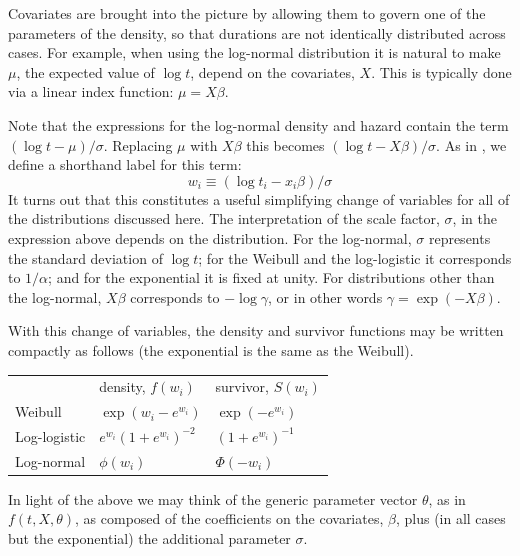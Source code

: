 Covariates are brought into the picture by allowing them to govern one
of the parameters of the density, so that durations are not
identically distributed across cases.  For example, when using the
log-normal distribution it is natural to make $\mu$, the expected
value of $\log t$, depend on the covariates, $X$.  This is typically
done via a linear index function: $\mu = X\beta$.

Note that the expressions for the log-normal density and hazard
contain the term $(\log t - \mu)/\sigma$.  Replacing $\mu$ with
$X\beta$ this becomes $(\log t - X\beta)/\sigma$.  As in
\cite{kalbfleisch02}, we define a shorthand label for this
term:
\begin{equation}
\label{eq:duration-w}
w_i \equiv (\log t_i - x_i\beta)/\sigma
\end{equation}
It turns out that this constitutes a useful simplifying change of
variables for all of the distributions discussed here.  The
interpretation of the scale factor, $\sigma$, in the expression above
depends on the distribution. For the log-normal, $\sigma$ represents
the standard deviation of $\log t$; for the Weibull and the
log-logistic it corresponds to $1/\alpha$; and for the exponential it
is fixed at unity. For distributions other than the log-normal,
$X\beta$ corresponds to $-\log \gamma$, or in other words
$\gamma = \exp(-X\beta)$.

With this change of variables, the density and survivor functions may
be written compactly as follows (the exponential is the same as the
Weibull).

\begin{center}
\setlength\tabcolsep{1.5em}
\begin{tabular}{lll}
 & density, $f(w_i)$ & survivor, $S(w_i)$ \\ [4pt]
Weibull & 
$\exp\left(w_i - e^{w_i}\right)$ & $\exp(-e^{w_i})$
\\ [4pt]
Log-logistic & 
$e^{w_i} \left(1 + e^{w_i}\right)^{-2}$ 
& $\left(1 + e^{w_i}\right)^{-1}$ \\ [1ex]
Log-normal & $\phi(w_i)$ & $\Phi(-w_i)$
\end{tabular}
\end{center}

In light of the above we may think of the generic parameter vector
$\theta$, as in $f(t, X, \theta)$, as composed of the coefficients on
the covariates, $\beta$, plus (in all cases but the exponential) the
additional parameter $\sigma$.

